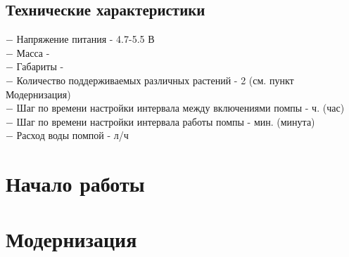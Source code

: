 \documentclass[12pt]{article}
\begin{document}
	\subsection{Технические характеристики}
	$-$ Напряжение питания - 4.7-5.5 В \\
	$-$ Масса - \\
	$-$ Габариты - \\
	$-$ Количество поддерживаемых различных растений - 2 (см. пункт Модернизация) \\
	$-$ Шаг по времени настройки интервала между включениями помпы - ч. (час) \\
	$-$ Шаг по времени настройки интервала работы помпы - мин. (минута)\\
	$-$ Расход воды помпой -  л/ч
	
	
	
	
	\section{Начало работы}
	
	
	\section{Модернизация}
	
	
	
	
	
\end{document}
